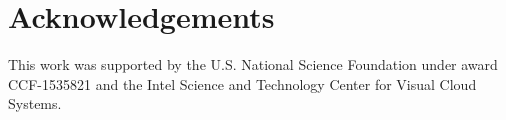 \section*{Acknowledgements}
This work was supported by the U.S. National Science
Foundation under award CCF-1535821 and the Intel Science and
Technology Center for Visual Cloud Systems.
